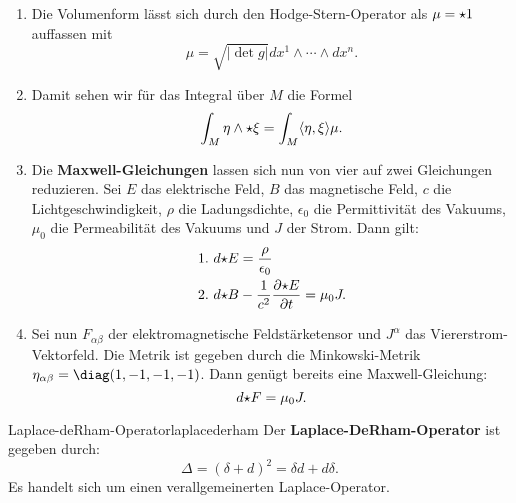 \begin{bemerkungen}
\begin{enumerate}
\item Die Volumenform lässt sich durch den Hodge-Stern-Operator als $\mu = {\star} 1$ auffassen mit
\begin{equation}
\mu = \sqrt{|\det g|} dx^1 \wedge \cdots \wedge dx^n.
\end{equation}
\item Damit sehen wir für das Integral über $M$ die Formel
\begin{equation}
\int_M \eta \wedge {\star} \xi = \int_M \langle \eta, \xi \rangle \mu.
\end{equation}
\item Die \textbf{Maxwell-Gleichungen} lassen sich nun von vier auf zwei Gleichungen reduzieren. Sei $E$ das elektrische Feld, $B$ das magnetische Feld, $c$ die Lichtgeschwindigkeit, $\rho$ die Ladungsdichte, $\epsilon_0$ die Permittivität des Vakuums, $\mu_0$ die Permeabilität des Vakuums und $J$ der Strom. Dann gilt:
\begin{align}
1.& \ d {\star} E = \frac{\rho}{\epsilon_0}\\
2.& \ d {\star} B - \frac{1}{c^2} \frac{\partial {\star} E}{\partial t} = \mu_0 J.
\end{align}
\item Sei nun $F_{\alpha \beta}$ der elektromagnetische Feldstärketensor und $J^\alpha$ das Viererstrom-Vektorfeld. Die Metrik ist gegeben durch die Minkowski-Metrik $\eta_{\alpha \beta} = \diag (1,-1,-1,-1)$. Dann genügt bereits eine Maxwell-Gleichung:
\begin{equation}
d {\star} F = \mu_0 J.
\end{equation}
\end{enumerate}
\end{bemerkungen}
\begin{definition}{Laplace-deRham-Operator}{laplacederham}
Der \textbf{Laplace-DeRham-Operator} ist gegeben durch:
\begin{equation}
\Delta = (\delta + d)^2 = \delta d + d \delta.
\end{equation}
Es handelt sich um einen verallgemeinerten Laplace-Operator.
\end{definition}